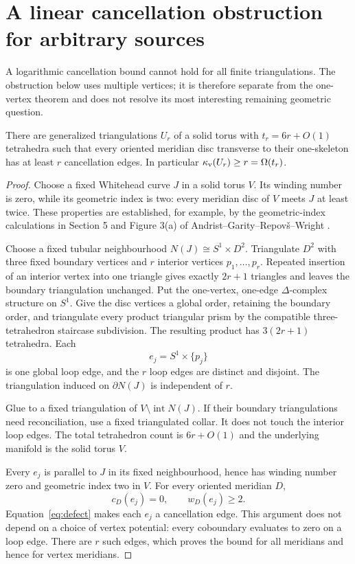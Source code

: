 \section{A linear cancellation obstruction for arbitrary sources}
\label{sec:whitehead}

A logarithmic cancellation bound cannot hold for all finite
triangulations. The obstruction below uses multiple vertices; it is
therefore separate from the one-vertex theorem and does not resolve its
most interesting remaining geometric question.

\begin{theorem}
\label{thm:whitehead}
There are generalized triangulations $U_r$ of a solid torus with
$t_r=6r+O(1)$ tetrahedra such that every oriented meridian disc transverse
to their one-skeleton has at least $r$ cancellation edges. In particular
$\kappa_{\mathrm{v}}(U_r)\ge r=\Omega(t_r)$.
\end{theorem}
\begin{proof}
Choose a fixed Whitehead curve $J$ in a solid torus $V$. Its winding
number is zero, while its geometric index is two: every meridian disc
of $V$ meets $J$ at least twice. These properties are established, for
example, by the geometric-index calculations in Section 5 and Figure 3(a)
of Andrist--Garity--Repov\v{s}--Wright \cite{geometric-index}.

Choose a fixed tubular neighbourhood $N(J)\cong S^1\times D^2$.
Triangulate $D^2$ with three fixed boundary vertices and $r$ interior
vertices $p_1,\ldots,p_r$. Repeated insertion of an interior vertex into
one triangle gives exactly $2r+1$ triangles and leaves the boundary
triangulation unchanged. Put the one-vertex, one-edge $\Delta$-complex
structure on $S^1$. Give the disc vertices a global order, retaining the
boundary order, and triangulate every product triangular prism by the
compatible three-tetrahedron staircase subdivision. The resulting
product has $3(2r+1)$ tetrahedra. Each
\[
                            e_j=S^1\times\{p_j\}
\]
is one global loop edge, and the $r$ loop edges are distinct and disjoint.
The triangulation induced on $\partial N(J)$ is independent of $r$.

Glue to a fixed triangulation of
$V\setminus\operatorname{int}N(J)$. If their boundary triangulations
need reconciliation, use a fixed triangulated collar. It does not touch
the interior loop edges. The total tetrahedron count is $6r+O(1)$ and
the underlying manifold is the solid torus $V$.

Every $e_j$ is parallel to $J$ in its fixed neighbourhood, hence has
winding number zero and geometric index two in $V$. For every oriented
meridian $D$,
\[
                         c_D(e_j)=0,\qquad w_D(e_j)\ge2.
\]
Equation~\eqref{eq:defect} makes each $e_j$ a cancellation edge. This
argument does not depend on a choice of vertex potential: every
coboundary evaluates to zero on a loop edge. There are $r$ such edges,
which proves the bound for all meridians and hence for vertex meridians.
\end{proof}

